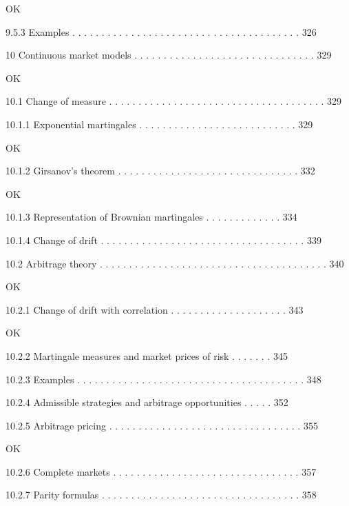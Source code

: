 OK

9.5.3 Examples . . . . . . . . . . . . . . . . . . . . . . . . . . . . . . . . . . . . . . . 326



10 Continuous market models . . . . . . . . . . . . . . . . . . . . . . . . . . . . . . . 329

OK

10.1 Change of measure . . . . . . . . . . . . . . . . . . . . . . . . . . . . . . . . . . . . . 329



10.1.1 Exponential martingales . . . . . . . . . . . . . . . . . . . . . . . . . . . 329

OK

10.1.2 Girsanov's theorem . . . . . . . . . . . . . . . . . . . . . . . . . . . . . . . 332

OK

10.1.3 Representation of Brownian martingales . . . . . . . . . . . . . 334



10.1.4 Change of drift . . . . . . . . . . . . . . . . . . . . . . . . . . . . . . . . . . . 339



10.2 Arbitrage theory . . . . . . . . . . . . . . . . . . . . . . . . . . . . . . . . . . . . . . . 340

OK

10.2.1 Change of drift with correlation . . . . . . . . . . . . . . . . . . . . 343

OK

10.2.2 Martingale measures and market prices of risk . . . . . . . 345



10.2.3 Examples . . . . . . . . . . . . . . . . . . . . . . . . . . . . . . . . . . . . . . . 348



10.2.4 Admissible strategies and arbitrage opportunities . . . . . 352



10.2.5 Arbitrage pricing . . . . . . . . . . . . . . . . . . . . . . . . . . . . . . . . . 355

OK

10.2.6 Complete markets . . . . . . . . . . . . . . . . . . . . . . . . . . . . . . . . 357



10.2.7 Parity formulas . . . . . . . . . . . . . . . . . . . . . . . . . . . . . . . . . . 358

